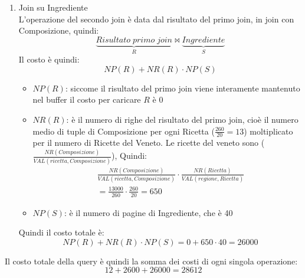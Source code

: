 \documentclass[a4paper,twoside]{article}
\begin{document}
\begin{exercise}
\begin{enumerate}
\begin{enumerate}
\begin{itemize}
            \item \( NR(R) \): è il numero di righe di Ricetta selezionate
              da Sel.Veneto che è data dalla \textbf{selettività} dell'attributo
              regione nella tabella Ricetta:
              \[
                NR(R) = \frac{NR(Ricetta)}{VAL(regione, Ricetta)} = \frac{260}{20} = 13
              \] 

            \item \( NP(S) \): è il numero di pagine di Composizione, che è 200
          \end{itemize}
          Quindi il costo totale è:
          \[
            NP(R) + NR(R) \cdot NP(S)
            =
            0 + 13 \cdot 200 = 2600
          \] 

        \item Join su Ingrediente\\
          L'operazione del secondo join è data dal risultato del primo join, 
          in join con Composizione, quindi:
          \[
            \underbrace{Risultato\;primo\;join}_R \bowtie
            \underbrace{Ingrediente}_{S}
          \] 
          Il costo è quindi:
          \[
            NP(R) + NR(R) \cdot NP(S)
          \] 
          \begin{itemize}
            \item \( NP(R) \): siccome il risultato del primo join viene
              interamente mantenuto nel buffer il costo per caricare \( R \) 
              è 0

            \item \( NR(R) \): è il numero di righe del risultato del primo
              join, cioè il numero medio di tuple di Composizione per ogni
              Ricetta (\( \frac{260}{20} = 13 \)) moltiplicato per il numero di Ricette del Veneto.
              Le ricette del veneto sono (\( \frac{NR(Composizione)}{VAL(ricetta, Composizione)} \)),
              Quindi:
              \[
                \begin{aligned}
                  &\frac{NR(Composizione)}{VAL(ricetta, Composizione)} \cdot
                  \frac{NR(Ricetta)}{VAL(regione, Ricetta)}\\
                  & = \frac{13000}{260} \cdot \frac{260}{20} = 650
                \end{aligned}
              \] 

            \item \( NP(S) \): è il numero di pagine di Ingrediente, che è 40
          \end{itemize}
          Quindi il costo totale è:
          \[
            NP(R) + NR(R) \cdot NP(S)
            =
            0 + 650 \cdot 40 = 26000
          \]
      \end{enumerate}
      Il costo totale della query è quindi la somma dei costi di ogni singola
      operazione:
      \[
        12 + 2600 + 26000 = 28612
      \] 


\end{enumerate}
\end{exercise}
\end{document}
